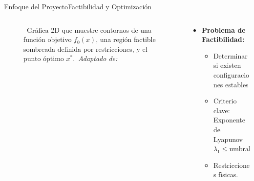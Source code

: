 \begin{frame}{Enfoque del Proyecto}{Factibilidad y Optimización}
    \begin{columns}
        \begin{column}{0.4\textwidth}
            \centering
            \begin{figure}[H]
                \centering
                \vspace{-0.25cm}
                \caption{\tiny~Gráfica 2D que muestre contornos de una función objetivo $f_0(x)$,
                        una región factible sombreada definida por restricciones, y el punto óptimo $x^*$.\ \textit{Adaptado de:}~\cite{BoydVandenbergheSlides2023}}%
                \label{fig:factibility_optimization}
            \end{figure}
        \end{column}
        \begin{column}{0.6\textwidth}
            \small
            \begin{itemize}
                \item \textbf{Problema de Factibilidad:}
                \begin{itemize}
                    \item Determinar si existen configuraciones estables
                    \item Criterio clave: Exponente de Lyapunov $\lambda_1 \leq \text{umbral}$
                    \item Restricciones físicas. %

\end{itemize}
\end{itemize}
\end{column}
\end{columns}
\end{frame}
